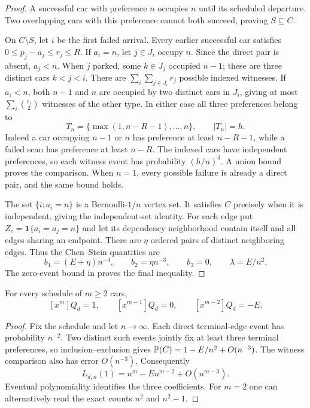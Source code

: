 \documentclass[11pt,a4paper]{article}
\newcommand{\ind}{\mathbf1}\newcommand{\spn}{\operatorname{span}}\newcommand{\MPF}{\operatorname{MPF}}\newcommand{\mpf}{\operatorname{mpf}}\newcommand{\Inj}{\operatorname{Inj}}
\begin{document}
\begin{proof}
A successful car with preference $n$ occupies $n$ until its scheduled
departure. Two overlapping cars with this preference cannot both
succeed, proving $S\subseteq C$.

On $C\setminus S$, let $i$ be the first failed arrival. Every earlier
successful car satisfies $0\le p_j-a_j\le r_j\le R$. If $a_i=n$,
let $j\in J_i$ occupy $n$. Since the direct pair is absent,
$a_j<n$. When $j$ parked, some $k\in J_j$ occupied $n-1$; these are
three distinct cars $k<j<i$. There are $\sum_i\sum_{j\in J_i}r_j$
possible indexed witnesses. If $a_i<n$, both $n-1$ and $n$ are
occupied by two distinct cars in $J_i$, giving at most
$\sum_i\binom{r_i}{2}$ witnesses of the other type. In either case
all three preferences belong to
\[
 T_n=\{\max(1,n-R-1),\ldots,n\},\qquad |T_n|=h.
\]
Indeed a car occupying $n-1$ or $n$ has preference at least
$n-R-1$, while a failed scan has preference at least $n-R$.
The indexed cars have independent preferences, so each witness
event has probability $(h/n)^3$. A union bound proves the comparison.
When $n=1$, every possible failure is already a direct pair, and the
same bound holds.

The set $\{i:a_i=n\}$ is a Bernoulli-$1/n$ vertex set. It satisfies
$C$ precisely when it is independent, giving the independent-set
identity. For each edge put $Z_e=\ind\{a_i=a_j=n\}$ and let its
dependency neighborhood contain itself and all edges sharing an
endpoint. There are $\eta$ ordered pairs of distinct neighboring
edges. Thus the Chen--Stein quantities are
\[
 b_1=(E+\eta)n^{-4},\qquad b_2=\eta n^{-3},\qquad b_3=0,
 \qquad\lambda=E/n^2.
\]
The zero-event bound in \cite{AGG} proves the final inequality.
\end{proof}

\begin{corollary}\label{cor:top}
For every schedule of $m\ge2$ cars,
\[
 [x^m]Q_d=1,\qquad [x^{m-1}]Q_d=0,
 \qquad [x^{m-2}]Q_d=-E.
\]
\end{corollary}
\begin{proof}
Fix the schedule and let $n\to\infty$. Each direct terminal-edge
event has probability $n^{-2}$. Two distinct such events jointly
fix at least three terminal preferences, so inclusion--exclusion
gives $\mathbb P(C)=1-E/n^2+O(n^{-3})$. The witness comparison also has
error $O(n^{-3})$. Consequently
\[
 L_{d,n}(1)=n^m-En^{m-2}+O(n^{m-3}).
\]
Eventual polynomiality identifies the three coefficients. For $m=2$
one can alternatively read the exact counts $n^2$ and $n^2-1$.
\end{proof}
\end{document}
